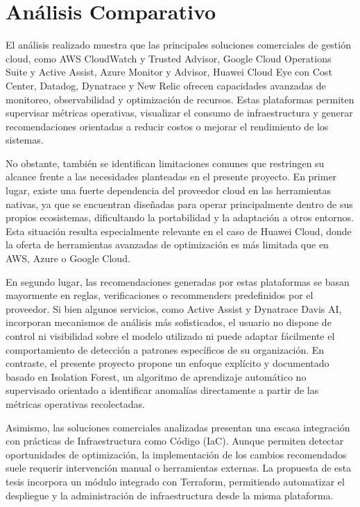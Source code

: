 \section{Análisis Comparativo}

El análisis realizado muestra que las principales soluciones comerciales de gestión cloud, como AWS CloudWatch y Trusted Advisor, Google Cloud Operations Suite y Active Assist, Azure Monitor y Advisor, Huawei Cloud Eye con Cost Center, Datadog, Dynatrace y New Relic ofrecen capacidades avanzadas de monitoreo, observabilidad y optimización de recursos. Estas plataformas permiten supervisar métricas operativas, visualizar el consumo de infraestructura y generar recomendaciones orientadas a reducir costos o mejorar el rendimiento de los sistemas.

No obstante, también se identifican limitaciones comunes que restringen su alcance frente a las necesidades planteadas en el presente proyecto. En primer lugar, existe una fuerte dependencia del proveedor cloud en las herramientas nativas, ya que se encuentran diseñadas para operar principalmente dentro de sus propios ecosistemas, dificultando la portabilidad y la adaptación a otros entornos. Esta situación resulta especialmente relevante en el caso de Huawei Cloud, donde la oferta de herramientas avanzadas de optimización es más limitada que en AWS, Azure o Google Cloud.

En segundo lugar, las recomendaciones generadas por estas plataformas se basan mayormente en reglas, verificaciones o recommenders predefinidos por el proveedor. Si bien algunos servicios, como Active Assist y Dynatrace Davis AI, incorporan mecanismos de análisis más sofisticados, el usuario no dispone de control ni visibilidad sobre el modelo utilizado ni puede adaptar fácilmente el comportamiento de detección a patrones específicos de su organización. En contraste, el presente proyecto propone un enfoque explícito y documentado basado en Isolation Forest, un algoritmo de aprendizaje automático no supervisado orientado a identificar anomalías directamente a partir de las métricas operativas recolectadas.

Asimismo, las soluciones comerciales analizadas presentan una escasa integración con prácticas de Infraestructura como Código (IaC). Aunque permiten detectar oportunidades de optimización, la implementación de los cambios recomendados suele requerir intervención manual o herramientas externas. La propuesta de esta tesis incorpora un módulo integrado con Terraform, permitiendo automatizar el despliegue y la administración de infraestructura desde la misma plataforma.

